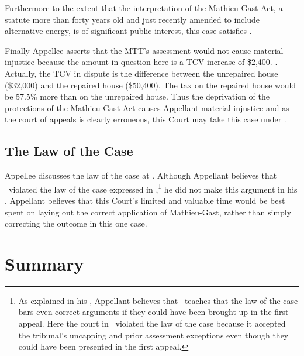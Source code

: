 \documentclass[12pt,\documentclassflag]{michiganCourtOfAppealsBrief}
\begin{document}
Furthermore to the extent that the interpretation of the Mathieu-Gast Act, a statute more than forty years old and just recently amended to include alternative energy, is of significant public interest, this case satisfies \cite{MCR 7.305(B)(2)}.

Finally Appellee asserts that the MTT's assessment would not cause material injustice because the amount in question here is a TCV increase of \$2,400. . Actually, the TCV in dispute is the difference between the unrepaired house (\$32,000) and the repaired house (\$50,400). The tax on the repaired house would be 57.5\% more than on the unrepaired house. Thus the deprivation of the protections of the Mathieu-Gast Act causes Appellant material injustice and as the court of appeals is clearly erroneous, this Court may take this case under \cite{MCR 7.305(B)(5)(a)}.


\subsection{The Law of the Case}

Appellee discusses the law of the case at . Although Appellant believes that \cite{Patru II}\ violated the law of the case expressed in \cite{Patru I},\footnote{As explained in his , Appellant believes that \ teaches that the law of the case bars even correct arguments if they could have been brought up in the first appeal. Here the court in \cite{Patru II}\ violated the law of the case because it accepted the tribunal's uncapping and prior assessment exceptions even though they could have been presented in the first appeal.} he did not make this argument in his \cite{Leave to Appeal}. Appellant believes that this Court's limited and valuable time would be best spent on laying out the correct application of Mathieu-Gast, rather than simply correcting the outcome in this one case.


\section{Summary}
\end{document}

